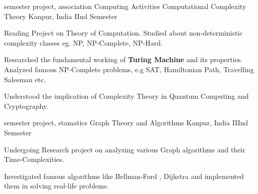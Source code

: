 


\begin{cventries}

 \cventry
    {semester project, association Computing Activities}
    {Computational Complexity Theory}
    {Kanpur, India}
    {IInd Semester}
    {
      \begin{cvitems}
         \item Reading Project on Theory of Computation. Studied about non-deterministic complexity classes eg. NP, NP-Complete, NP-Hard.
  \item Researched the fundamental working of \textbf{Turing Machine} and its properties. Analyzed famous NP-Complete problems, e.g SAT, Hamiltonian Path, Travelling Salesman etc. 
  \item Understood the implication of Complexity Theory in Quantum Computing and Cryptography. 
      \end{cvitems}
    }
    
 \cventry
    {semester project, stamatics }
    {Graph Theory and Algorithms}
    {Kanpur, India}
    {IIInd Semester}
    {
      \begin{cvitems}
         \item Undergoing Research project on analyzing various Graph algorithms and their Time-Complexities.
         \item Investigated famous algorithms like Bellman-Ford , Dijkstra and implemented them in solving real-life problems.  
      \end{cvitems}
    }

\end{cventries}

